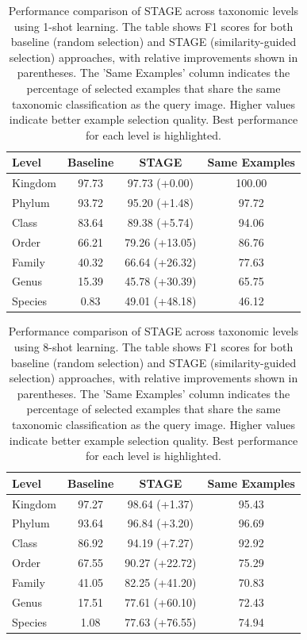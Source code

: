 \begin{table}[htbp]
\centering
\caption{Performance comparison of STAGE across taxonomic levels using 1-shot learning. 
    The table shows F1 scores for both baseline (random selection) and STAGE (similarity-guided selection) approaches, 
    with relative improvements shown in parentheses. The 'Same Examples' column indicates the percentage of selected examples 
    that share the same taxonomic classification as the query image. Higher values indicate better example selection quality. 
    Best performance for each level is highlighted.}
\label{tab:hierarchical_results_1shot}
\begin{tabular}{lccc}
\hline
Level & Baseline & STAGE & Same Examples \\
\hline
Kingdom & 97.73 & 97.73 (+0.00) & 100.00 \\
Phylum & 93.72 & \colorbox{yellow!25}{95.20 (+1.48)} & 97.72 \\
Class & 83.64 & \colorbox{yellow!25}{89.38 (+5.74)} & 94.06 \\
Order & 66.21 & \colorbox{yellow!25}{79.26 (+13.05)} & 86.76 \\
Family & 40.32 & \colorbox{yellow!25}{66.64 (+26.32)} & 77.63 \\
Genus & 15.39 & \colorbox{yellow!25}{45.78 (+30.39)} & 65.75 \\
Species & 0.83 & \colorbox{yellow!25}{49.01 (+48.18)} & 46.12 \\
\hline
\end{tabular}
\end{table}
\vspace{2em}
\begin{table}[htbp]
\centering
\caption{Performance comparison of STAGE across taxonomic levels using 8-shot learning. 
    The table shows F1 scores for both baseline (random selection) and STAGE (similarity-guided selection) approaches, 
    with relative improvements shown in parentheses. The 'Same Examples' column indicates the percentage of selected examples 
    that share the same taxonomic classification as the query image. Higher values indicate better example selection quality. 
    Best performance for each level is highlighted.}
\label{tab:hierarchical_results_8shot}
\begin{tabular}{lccc}
\hline
Level & Baseline & STAGE & Same Examples \\
\hline
Kingdom & 97.27 & \colorbox{yellow!25}{98.64 (+1.37)} & 95.43 \\
Phylum & 93.64 & \colorbox{yellow!25}{96.84 (+3.20)} & 96.69 \\
Class & 86.92 & \colorbox{yellow!25}{94.19 (+7.27)} & 92.92 \\
Order & 67.55 & \colorbox{yellow!25}{90.27 (+22.72)} & 75.29 \\
Family & 41.05 & \colorbox{yellow!25}{82.25 (+41.20)} & 70.83 \\
Genus & 17.51 & \colorbox{yellow!25}{77.61 (+60.10)} & 72.43 \\
Species & 1.08 & \colorbox{yellow!25}{77.63 (+76.55)} & 74.94 \\
\hline
\end{tabular}
\end{table}